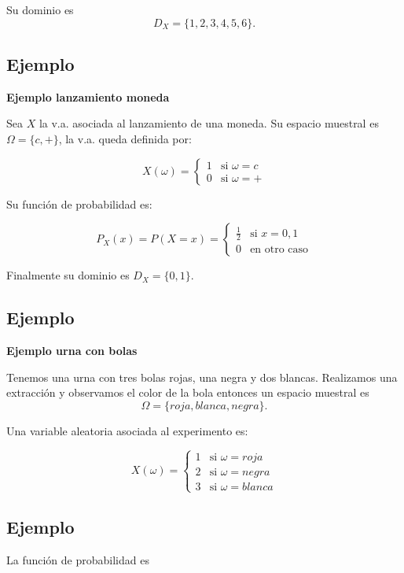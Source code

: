 \documentclass[]{book}
\begin{document}
Su dominio es \[D_X=\{1,2,3,4,5,6\}.\]

\hypertarget{ejemplo-6}{%
\subsection{Ejemplo}\label{ejemplo-6}}

\textbf{Ejemplo lanzamiento moneda}

Sea \(X\) la v.a. asociada al lanzamiento de una moneda. Su espacio muestral es \(\Omega=\{c,+\}\), la v.a. queda definida por:

\[X(\omega)=\left\{\begin{array}{ll} 1 & \mbox{si } \omega=c \\
0 & \mbox{si }\omega=+\end{array}\right.\]

Su función de probabilidad es:

\[P_{X}(x)=P(X=x)=\left\{\begin{array}{ll} \frac12 & \mbox{si } x=0,1\\
0 & \mbox{en otro caso}\end{array}\right.\]

Finalmente su dominio es \(D_X=\{0,1\}.\)

\hypertarget{ejemplo-7}{%
\subsection{Ejemplo}\label{ejemplo-7}}

\textbf{Ejemplo urna con bolas}

Tenemos una urna con tres bolas rojas, una negra y dos blancas. Realizamos una extracción y observamos el color de la bola entonces un espacio muestral es
\[\Omega=\{roja, blanca, negra\}.\]

Una variable aleatoria asociada al experimento es:

\[X(\omega)=\left\{\begin{array}{ll} 1 & \mbox{si } \omega=roja  \\
2 & \mbox{si }\omega=negra \\ 3 & \mbox{si } \omega=blanca \end{array}\right.\]

\hypertarget{ejemplo-8}{%
\subsection{Ejemplo}\label{ejemplo-8}}

La función de probabilidad es
\end{document}
